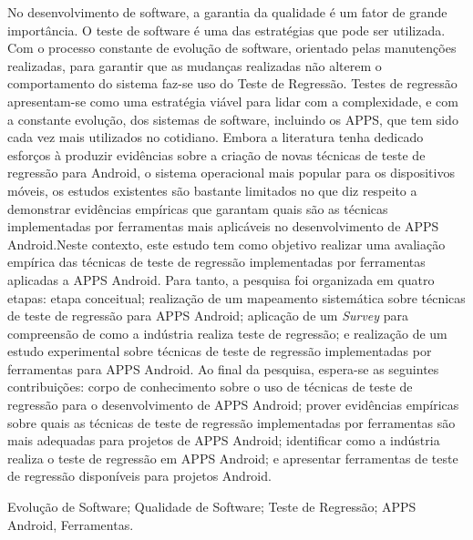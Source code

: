 
\resumo
No desenvolvimento de software, a garantia da qualidade é um fator de grande importância. O teste de software é uma das estratégias que pode ser utilizada. Com o processo constante de evolução de software, orientado pelas manutenções realizadas, para garantir que as mudanças realizadas não alterem o comportamento do sistema faz-se uso do Teste de Regressão. Testes de regressão apresentam-se como uma estratégia viável para lidar com a complexidade, e com a constante evolução, dos sistemas de software, incluindo os \ac{APPS}, que tem sido cada vez mais utilizados no cotidiano. Embora a literatura tenha dedicado esforços à produzir evidências sobre a criação de novas técnicas de teste de regressão para Android,  o sistema operacional mais popular para os dispositivos móveis, os estudos existentes são bastante limitados no que diz respeito a demonstrar evidências empíricas que garantam quais são as técnicas implementadas por ferramentas mais aplicáveis no desenvolvimento de \ac{APPS} Android.Neste contexto, este estudo tem como objetivo realizar uma avaliação empírica das técnicas de teste de regressão implementadas por ferramentas aplicadas a \ac{APPS} Android. Para tanto, a pesquisa foi organizada em quatro etapas: etapa conceitual; realização de um mapeamento sistemática sobre técnicas de teste de regressão para \ac{APPS} Android; aplicação de um \textit{Survey} para compreensão de como a indústria realiza teste de regressão; e realização de um estudo experimental sobre técnicas de teste de regressão implementadas por ferramentas para \ac{APPS} Android. Ao final da pesquisa, espera-se as seguintes contribuições: corpo de conhecimento sobre o uso de técnicas de teste de regressão para o desenvolvimento de \ac {APPS} Android; prover evidências empíricas sobre quais as técnicas de teste de regressão implementadas por ferramentas são mais adequadas para projetos de \ac{APPS} Android; identificar como a indústria realiza o teste de regressão em \ac{APPS} Android; e apresentar ferramentas de teste de regressão disponíveis para projetos Android.



\begin{keywords}
Evolução de Software; Qualidade de Software; Teste de Regressão; APPS Android, Ferramentas.
\end{keywords}


